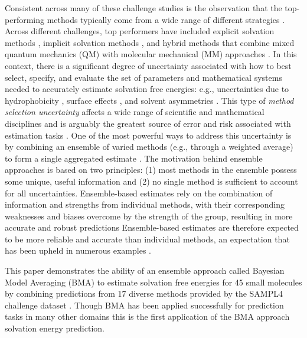 \documentclass[journal=jpcbfk, manuscript=article]{achemso}
\newcommand{\+}[1]{\ensuremath{\mathbf{#1}}}
\begin{document}
Consistent across many of these challenge studies is the observation that the top-performing methods typically come from a wide range of different strategies \cite{Nicholls:2008, Mobley:2009b, Mobley:2009, Mobley:2014}.
Across different challenges, top performers have included explicit solvation methods \cite{Klimovich:2010, Levy:1998, Mobley:2009c}, implicit solvation methods \cite{Mennucci:2007,Jorgensen:2004}, and hybrid methods that combine mixed quantum mechanics (QM) with molecular mechanical (MM) approaches \cite{Konig:2014, Kamerlin:2009}.
In this context, there is a significant degree of uncertainty associated with how to best select, specify, and evaluate the set of parameters and mathematical systems needed to accurately estimate solvation free energies: e.g., uncertainties due to hydrophobicity \cite{Ashbaugh:1999}, surface effects \cite{Chorny:05}, and solvent asymmetries \cite{Mobley:08}.  This type of \emph{method selection uncertainty} affects a wide range of scientific and mathematical disciplines and is arguably the greatest source of error and risk associated with estimation tasks \cite{Rojas:2010, Apostolakis:1990, Devooght:1998, Neuman:2003}.
One of the most powerful ways to address this uncertainty is by combining an ensemble of varied methods (e.g., through a weighted average) to form a single aggregated estimate \cite{Bates:1969, Opitz:1999, Rokach:2010, Hoeting:1999}.
The motivation behind ensemble approaches is based on two principles: (1) most methods in the ensemble possess some unique, useful information and (2) no single method is sufficient to account for all uncertainties.
Ensemble-based estimates rely on the combination of information and strengths from individual methods, with their corresponding weaknesses and biases overcome by the strength of the group, resulting in more accurate and robust predictions 
Ensemble-based estimates are therefore expected to be more reliable and accurate than individual methods, an expectation that has been upheld in numerous examples \cite{Gosink:2014, Zhang:2003, Bates:1969, Morales-Casique:2010, Opitz:1999, Rokach:2010, Hoeting:1999, Seni:2010, Raftery:2005, Vlachopoulo:2013, Seni:2010, Hoeting:1999, Raftery:1998, Raftery:1995}.

This paper demonstrates the ability of an ensemble approach called Bayesian Model Averaging (BMA) \cite{Hoeting:1999} to estimate solvation free energies for 45 small molecules by combining predictions from 17 diverse methods provided by the SAMPL4 challenge dataset \cite{Mobley:2014}.
Though BMA has been applied successfully for prediction tasks in many other domains \cite{Ye:2004, Vlachopoulo:2013, Raftery:2005, Morales-Casique:2010, Gosink:2014} this is the first application of the BMA approach solvation energy prediction.
\end{document}

